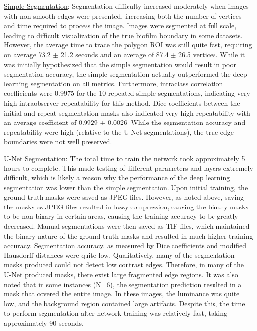 \documentclass[conference]{IEEEtran}
\begin{document}
\ul{Simple Segmentation}: Segmentation difficulty increased moderately when images with non-smooth edges were presented, increasing both the number of vertices and time required to process the image. Images were segmented at full scale, leading to difficult visualization of the true biofilm boundary in some datasets. However, the average time to trace the polygon ROI was still quite fast, requiring on average 73.2 $\pm$ 21.2 seconds and an average of 87.4 $\pm$ 26.5 vertices. While it was initially hypothesized that the simple segmentation would result in poor segmentation accuracy, the simple segmentation actually outperformed the deep learning segmentation on all metrics. Furthermore, intraclass correlation coefficients were 0.9975 for the 10 repeated simple segmentations, indicating very high intraobserver repeatability for this method. Dice coefficients between the initial and repeat segmentation masks also indicated very high repeatability with an average coefficient of 0.9929 $\pm$
 0.0026. While the segmentation accuracy and repeatability were high (relative to the U-Net segmentations), the true edge boundaries were not well preserved.

\ul{U-Net Segmentation}: The total time to train the network took approximately 5 hours to complete. This made testing of different parameters and layers extremely difficult, which is likely a reason why the performance of the deep learning segmentation was lower than the simple segmentation. Upon initial training, the ground-truth masks were saved as JPEG files. However, as noted above, saving the masks as JPEG files resulted in lossy compression, causing the binary masks to be non-binary in certain areas, causing the training accuracy to be greatly decreased. Manual segmentations were then saved as TIF files, which maintained the binary nature of the ground-truth masks and resulted in much higher training accuracy. Segmentation accuracy, as measured by Dice coefficients and modified Hausdorff distances were quite low. Qualitatively, many of the segmentation masks produced could not detect low contrast edges. Therefore, in many of the U-Net produced masks, there exist large fragmented edge regions. It was also noted that in some instances (N=6), the segmentation prediction resulted in a mask that covered the entire image. In these images, the luminance was quite low, and the background region contained large artifacts. Despite this, the time to perform segmentation after network training was relatively fast, taking approximately 90 seconds.
\end{document}
